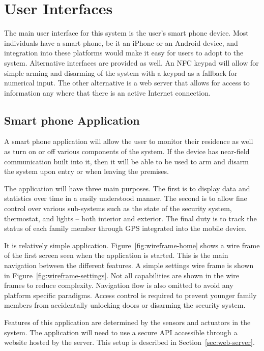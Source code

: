 \documentclass{report}
\begin{document}
\chapter{User Interfaces}
\label{ch:user-interfaces}
The main user interface for this system is the user's smart phone device. Most
individuals have a smart phone, be it an iPhone or an Android device, and
integration into these platforms would make it easy for users to adopt to the
system. Alternative interfaces are provided as well. An NFC keypad will allow
for simple arming and disarming of the system with a keypad as a fallback for
numerical input. The other alternative is a web server that allows for access
to information any where that there is an active Internet connection.

\section{Smart phone Application}
\label{sec:mobile-app}
A smart phone application will allow the user to monitor their residence as well
as turn on or off various components of the system. If the device has
near-field communication built into it, then it will be able to be used to
arm and disarm the system upon entry or when leaving the premises. 

The application will have three main purposes. The first is to display data and
statistics over time in a easily understood manner. The second is to allow fine
control over various sub-systems such as the state of the security system,
thermostat, and lights -- both interior and exterior. The final duty is to
track the status of each family member through GPS integrated into the mobile
device. 

It is relatively simple application. Figure~\ref{fig:wireframe-home} shows a
wire frame of the first screen seen when the application is started. This is the
main navigation between the different features. A simple settings wire frame is
shown in Figure~\ref{fig:wireframe-settings}. Not all capabilities are shown in
the wire frames to reduce complexity. Navigation flow is also omitted to avoid
any platform specific paradigms. Access control is required to prevent younger
family members from accidentally unlocking doors or disarming the security
system.

Features of this application are determined by the sensors and actuators in the
system. The application will need to use a secure API accessible through a
website hosted by the server. This setup is described in
Section~\ref{sec:web-server}.
\end{document}
